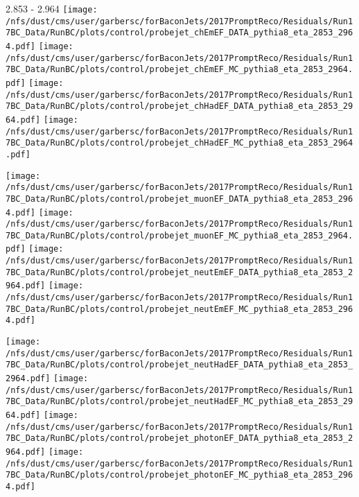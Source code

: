 \documentclass[t,compress]{beamer}
\begin{document}
\begin{frame}{2.853 - 2.964}
	\texttt{[image: /nfs/dust/cms/user/garbersc/forBaconJets/2017PromptReco/Residuals/Run17BC\_Data/RunBC/plots/control/probejet\_chEmEF\_DATA\_pythia8\_eta\_2853\_2964.pdf]}
	\texttt{[image: /nfs/dust/cms/user/garbersc/forBaconJets/2017PromptReco/Residuals/Run17BC\_Data/RunBC/plots/control/probejet\_chEmEF\_MC\_pythia8\_eta\_2853\_2964.pdf]}
	\texttt{[image: /nfs/dust/cms/user/garbersc/forBaconJets/2017PromptReco/Residuals/Run17BC\_Data/RunBC/plots/control/probejet\_chHadEF\_DATA\_pythia8\_eta\_2853\_2964.pdf]}
	\texttt{[image: /nfs/dust/cms/user/garbersc/forBaconJets/2017PromptReco/Residuals/Run17BC\_Data/RunBC/plots/control/probejet\_chHadEF\_MC\_pythia8\_eta\_2853\_2964.pdf]}
\newline

\vspace{-0.65cm}
	\texttt{[image: /nfs/dust/cms/user/garbersc/forBaconJets/2017PromptReco/Residuals/Run17BC\_Data/RunBC/plots/control/probejet\_muonEF\_DATA\_pythia8\_eta\_2853\_2964.pdf]}
	\texttt{[image: /nfs/dust/cms/user/garbersc/forBaconJets/2017PromptReco/Residuals/Run17BC\_Data/RunBC/plots/control/probejet\_muonEF\_MC\_pythia8\_eta\_2853\_2964.pdf]}
	\texttt{[image: /nfs/dust/cms/user/garbersc/forBaconJets/2017PromptReco/Residuals/Run17BC\_Data/RunBC/plots/control/probejet\_neutEmEF\_DATA\_pythia8\_eta\_2853\_2964.pdf]}
	\texttt{[image: /nfs/dust/cms/user/garbersc/forBaconJets/2017PromptReco/Residuals/Run17BC\_Data/RunBC/plots/control/probejet\_neutEmEF\_MC\_pythia8\_eta\_2853\_2964.pdf]}
\newline

\vspace{-0.65cm}
	\texttt{[image: /nfs/dust/cms/user/garbersc/forBaconJets/2017PromptReco/Residuals/Run17BC\_Data/RunBC/plots/control/probejet\_neutHadEF\_DATA\_pythia8\_eta\_2853\_2964.pdf]}
	\texttt{[image: /nfs/dust/cms/user/garbersc/forBaconJets/2017PromptReco/Residuals/Run17BC\_Data/RunBC/plots/control/probejet\_neutHadEF\_MC\_pythia8\_eta\_2853\_2964.pdf]}
	\texttt{[image: /nfs/dust/cms/user/garbersc/forBaconJets/2017PromptReco/Residuals/Run17BC\_Data/RunBC/plots/control/probejet\_photonEF\_DATA\_pythia8\_eta\_2853\_2964.pdf]}
	\texttt{[image: /nfs/dust/cms/user/garbersc/forBaconJets/2017PromptReco/Residuals/Run17BC\_Data/RunBC/plots/control/probejet\_photonEF\_MC\_pythia8\_eta\_2853\_2964.pdf]}
\end{frame}
\end{document}
